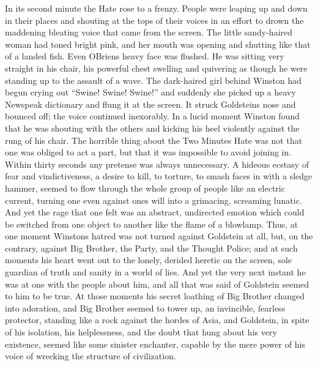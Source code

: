 In its second minute the Hate rose to a frenzy. People were leaping up
and down in their places and shouting at the tops of their voices in an
effort to drown the maddening bleating voice that came from the screen.
The little sandy-haired woman had toned bright pink, and her mouth was
opening and shutting like that of a landed fish. Even
O\textquotesingle Brien\textquotesingle s heavy face was flushed. He was
sitting very straight in his chair, his powerful chest swelling and
quivering as though he were standing up to the assault of a wave. The
dark-haired girl behind Winston had begun crying out ``Swine! Swine!
Swine!'' and suddenly she picked up a heavy Newspeak dictionary and flung
it at the screen. It struck Goldstein\textquotesingle s nose and bounced
off; the voice continued inexorably. In a lucid moment Winston found
that he was shouting with the others and kicking his heel violently
against the rung of his chair. The horrible thing about the Two Minutes
Hate was not that one was obliged to act a part, but that it was
impossible to avoid joining in. Within thirty seconds any pretense was
always unnecessary. A hideous ecstasy of fear and vindictiveness, a
desire to kill, to torture, to smash faces in with a sledge hammer,
seemed to flow through the whole group of people like an electric
current, turning one even against one\textquotesingle s will into a
grimacing, screaming lunatic. And yet the rage that one felt was an
abstract, undirected emotion which could be switched from one object to
another like the flame of a blowlamp. Thus, at one moment
Winston\textquotesingle s hatred was not turned against Goldstein at
all, but, on the contrary, against Big Brother, the Party, and the
Thought Police; and at such moments his heart went out to the lonely,
derided heretic on the screen, sole guardian of truth and sanity in a
world of lies. And yet the very next instant he was at one with the
people about him, and all that was said of Goldstein seemed to him to be
true. At those moments his secret loathing of Big Brother changed into
adoration, and Big Brother seemed to tower up, an invincible, fearless
protector, standing like a rock against the hordes of Asia, and
Goldstein, in spite of his isolation, his helplessness, and the doubt
that hung about his very existence, seemed like some sinister enchanter,
capable by the mere power of his voice of wrecking the structure of
civilization.


